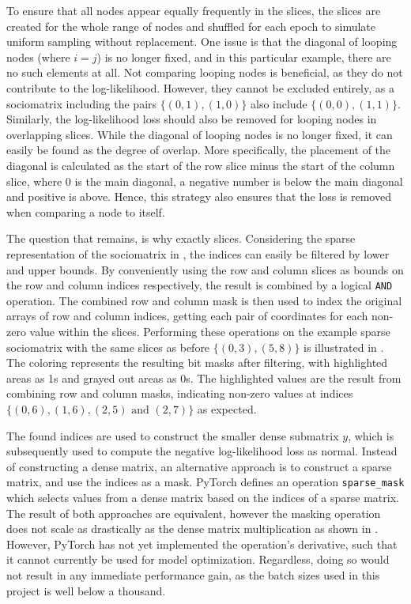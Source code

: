         To ensure that all nodes appear equally frequently in the slices, the slices are created for the whole range of nodes and shuffled for each epoch to simulate uniform sampling without replacement.
        One issue is that the diagonal of looping nodes (where $i=j$) is no longer fixed, and in this particular example, there are no such elements at all. Not comparing looping nodes is beneficial, as they do not contribute to the log-likelihood. However, they cannot be excluded entirely, as a sociomatrix including the pairs $\{(0,1), (1,0)\}$ also include $\{(0,0), (1,1)\}$. Similarly, the log-likelihood loss should also be removed for looping nodes in overlapping slices.
        While the diagonal of looping nodes is no longer fixed, it can easily be found as the degree of overlap. More specifically, the placement of the diagonal is calculated as the start of the row slice minus the start of the column slice, where 0 is the main diagonal, a negative number is below the main diagonal and positive is above. Hence, this strategy also ensures that the loss is removed when comparing a node to itself.
        
        The question that remains, is why exactly slices. Considering the sparse representation of the sociomatrix in , the indices can easily be filtered by lower and upper bounds. By conveniently using the row and column slices as bounds on the row and column indices respectively, the result is combined by a logical \texttt{AND} operation. The combined row and column mask is then used to index the original arrays of row and column indices, getting each pair of coordinates for each non-zero value within the slices. Performing these operations on the example sparse sociomatrix with the same slices as before $\{(0,3), (5,8)\}$ is illustrated in . The coloring represents the resulting bit masks after filtering, with highlighted areas as 1s and grayed out areas as 0s. The highlighted values are the result from combining row and column masks, indicating non-zero values at indices $\{(0,6),(1,6),(2,5) \text{ and } (2,7)\}$ as expected.
        
        The found indices are used to construct the smaller dense submatrix $y$, which is subsequently used to compute the negative log-likelihood loss as normal.
        Instead of constructing a dense matrix, an alternative approach is to construct a sparse matrix, and use the indices as a mask. PyTorch defines an operation \texttt{sparse\_mask} which selects values from a dense matrix based on the indices of a sparse matrix. The result of both approaches are equivalent, however the masking operation does not scale as drastically as the dense matrix multiplication as shown in .
        However, PyTorch has not yet implemented the operation's derivative, such that it cannot currently be used for model optimization. Regardless, doing so would not result in any immediate performance gain, as the batch sizes used in this project is well below a thousand.
        
